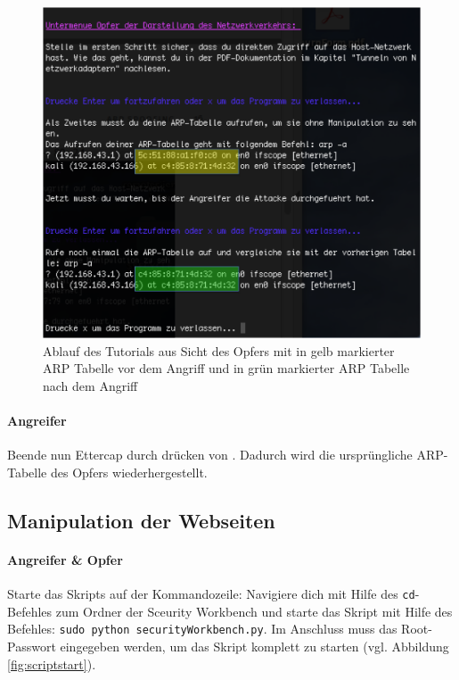  \begin{figure}
	\centering
	\includegraphics[width=\textwidth]{images/ARP_Spoofing/NetzwerkverkehrOpfer}
	\caption{Ablauf des Tutorials aus Sicht des Opfers mit in gelb markierter ARP Tabelle vor dem Angriff und in grün markierter ARP Tabelle nach dem Angriff}
	\label{fig:netzwerkverkehropfer}
\end{figure}

\paragraph{Angreifer} Beende nun Ettercap durch drücken von . Dadurch wird die ursprüngliche ARP-Tabelle des Opfers wiederhergestellt.

\subsection{Manipulation der Webseiten}
\paragraph{Angreifer \& Opfer} Starte das Skripts auf der Kommandozeile: Navigiere dich mit Hilfe des \colorbox{altgray}{\lstinline|cd|}-Befehles zum Ordner der Sceurity Workbench und starte das Skript mit Hilfe des Befehles: \colorbox{altgray}{\lstinline|sudo python securityWorkbench.py|}. Im Anschluss muss das Root-Passwort eingegeben werden, um das Skript komplett zu starten (vgl. Abbildung \ref{fig:scriptstart}).

